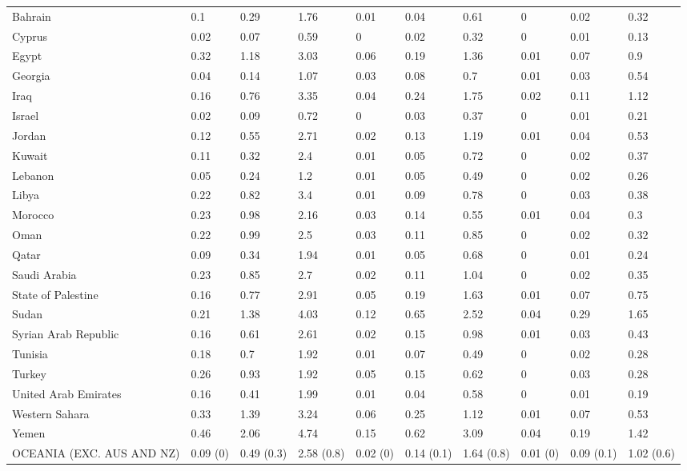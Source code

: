 \begin{longtable}[t]{llllllllll}
Bahrain & 0.1 & 0.29 & 1.76 & 0.01 & 0.04 & 0.61 & 0 & 0.02 & 0.32\\
Cyprus & 0.02 & 0.07 & 0.59 & 0 & 0.02 & 0.32 & 0 & 0.01 & 0.13\\
Egypt & 0.32 & 1.18 & 3.03 & 0.06 & 0.19 & 1.36 & 0.01 & 0.07 & 0.9\\
Georgia & 0.04 & 0.14 & 1.07 & 0.03 & 0.08 & 0.7 & 0.01 & 0.03 & 0.54\\
Iraq & 0.16 & 0.76 & 3.35 & 0.04 & 0.24 & 1.75 & 0.02 & 0.11 & 1.12\\
Israel & 0.02 & 0.09 & 0.72 & 0 & 0.03 & 0.37 & 0 & 0.01 & 0.21\\
Jordan & 0.12 & 0.55 & 2.71 & 0.02 & 0.13 & 1.19 & 0.01 & 0.04 & 0.53\\
Kuwait & 0.11 & 0.32 & 2.4 & 0.01 & 0.05 & 0.72 & 0 & 0.02 & 0.37\\
Lebanon & 0.05 & 0.24 & 1.2 & 0.01 & 0.05 & 0.49 & 0 & 0.02 & 0.26\\
Libya & 0.22 & 0.82 & 3.4 & 0.01 & 0.09 & 0.78 & 0 & 0.03 & 0.38\\
Morocco & 0.23 & 0.98 & 2.16 & 0.03 & 0.14 & 0.55 & 0.01 & 0.04 & 0.3\\
Oman & 0.22 & 0.99 & 2.5 & 0.03 & 0.11 & 0.85 & 0 & 0.02 & 0.32\\
Qatar & 0.09 & 0.34 & 1.94 & 0.01 & 0.05 & 0.68 & 0 & 0.01 & 0.24\\
Saudi Arabia & 0.23 & 0.85 & 2.7 & 0.02 & 0.11 & 1.04 & 0 & 0.02 & 0.35\\
State of Palestine & 0.16 & 0.77 & 2.91 & 0.05 & 0.19 & 1.63 & 0.01 & 0.07 & 0.75\\
Sudan & 0.21 & 1.38 & 4.03 & 0.12 & 0.65 & 2.52 & 0.04 & 0.29 & 1.65\\
Syrian Arab Republic & 0.16 & 0.61 & 2.61 & 0.02 & 0.15 & 0.98 & 0.01 & 0.03 & 0.43\\
Tunisia & 0.18 & 0.7 & 1.92 & 0.01 & 0.07 & 0.49 & 0 & 0.02 & 0.28\\
Turkey & 0.26 & 0.93 & 1.92 & 0.05 & 0.15 & 0.62 & 0 & 0.03 & 0.28\\
United Arab Emirates & 0.16 & 0.41 & 1.99 & 0.01 & 0.04 & 0.58 & 0 & 0.01 & 0.19\\
Western Sahara & 0.33 & 1.39 & 3.24 & 0.06 & 0.25 & 1.12 & 0.01 & 0.07 & 0.53\\
Yemen & 0.46 & 2.06 & 4.74 & 0.15 & 0.62 & 3.09 & 0.04 & 0.19 & 1.42\\
OCEANIA (EXC. AUS AND NZ) & 0.09 (0) & 0.49 (0.3) & 2.58 (0.8) & 0.02 (0) & 0.14 (0.1) & 1.64 (0.8) & 0.01 (0) & 0.09 (0.1) & 1.02 (0.6)\\

\end{longtable}
